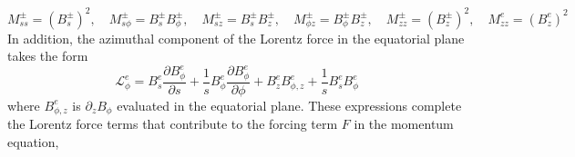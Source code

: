 %
\[
    M_{ss}^\pm = (B_s^\pm)^2,\quad M_{s\phi}^\pm = B_s^\pm B_\phi^\pm,\quad M_{sz}^\pm = B_s^\pm B_z^\pm,\quad M_{\phi z}^\pm = B_\phi^\pm B_z^\pm,\quad M_{zz}^\pm = (B_z^\pm)^2,\quad M_{zz}^e = (B_z^e)^2
\]
%
In addition, the azimuthal component of the Lorentz force in the equatorial plane takes the form \citep{holdenried-chernoff_long_2021}
%
\begin{equation}\label{eqn:lorentz-e-pg}
    \mathcal{L}_\phi^e = B_s^e \frac{\partial B_\phi^e}{\partial s} + \frac{1}{s} B_\phi^e \frac{\partial B_\phi^e}{\partial \phi} + B_z^e B_{\phi,z}^e + \frac{1}{s} B_s^e B_\phi^e
\end{equation}
%
where $B_{\phi,z}^e$ is $\partial_z B_\phi$ evaluated in the equatorial plane. These expressions complete the Lorentz force terms that contribute to the forcing term $F$ in the momentum equation, 

